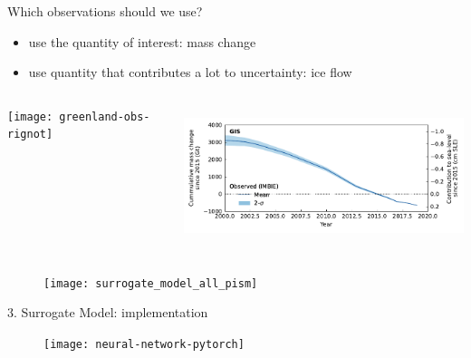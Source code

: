 \documentclass[aspectratio=169,hide notes,intlimits]{beamer}
\begin{document}
\begin{frame}{Which observations should we use?}
    \begin{minipage}[t][2cm][t]{\textwidth}
        \begin{itemize}
        \item use the quantity of interest: \alert{mass change}
        \item use quantity that contributes a lot to uncertainty: \alert{ice flow}
        \end{itemize}
  \end{minipage}
    \begin{minipage}[t][6cm][t]{\textwidth}
        \begin{columns}[c]
    \begin{column}{.3\textwidth}
    \texttt{[image: greenland-obs-rignot]}
    \end{column}
    \begin{column}{.65\textwidth}
    \includegraphics[height=4cm]{GIS_hist_only_obs}
    \end{column}
  \end{columns}
    \end{minipage}
\end{frame}



\begin{frame}{}
  \vspace{-1.5em}
    \begin{minipage}[t][8.2cm][t]{\textwidth}
    \begin{figure}
      \texttt{[image: surrogate\_model\_all\_pism]}
    \end{figure}
    \end{minipage}
\end{frame}


\begin{frame}{3. Surrogate Model: implementation}
  \begin{figure}
    \texttt{[image: neural-network-pytorch]}
  \end{figure}
\end{frame}
\end{document}

